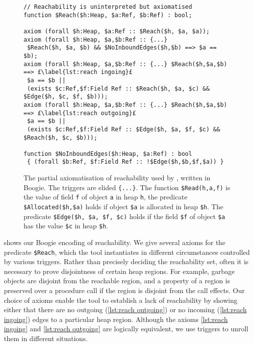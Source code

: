 \documentclass[runningheads,a4paper]{llncs}
\begin{document}
\begin{figure}[htbp]%
\centering%
\noindent\begin{lstlisting}[style=Boogie,firstnumber=auto,name=copyex]
// Reachability is uninterpreted but axiomatised
function $Reach($h:Heap, $a:Ref, $b:Ref) : bool;

axiom (forall $h:Heap, $a:Ref :: $Reach($h, $a, $a));
axiom (forall $h:Heap, $a,$b:Ref :: {...}
 $Reach($h, $a, $b) && $NoInboundEdges($h,$b) ==> $a == $b);
axiom (forall $h:Heap, $a,$b:Ref :: {...} $Reach($h,$a,$b) ==> £\label{lst:reach ingoing}£
 $a == $b ||
 (exists $c:Ref,$f:Field Ref :: $Reach($h, $a, $c) && $Edge($h, $c, $f, $b)));
axiom (forall $h:Heap, $a,$b:Ref :: {...} $Reach($h,$a,$b) ==> £\label{lst:reach outgoing}£
 $a == $b ||
 (exists $c:Ref,$f:Field Ref :: $Edge($h, $a, $f, $c) && $Reach($h, $c, $b)));

function $NoInboundEdges($h:Heap, $a:Ref) : bool
 { (forall $b:Ref, $f:Field Ref :: !$Edge($h,$b,$f,$a)) }
\end{lstlisting}
\caption{The partial axiomatisation of reachability used by \tool{}, written in Boogie. The triggers are elided \texttt{\{...\}}. The function \texttt{\$Read(h,a,f)} is the value of field \texttt{f} of object \texttt{a} in heap \texttt{h}, the predicate \texttt{\$Allocated(\$h,\$a)} holds if object \texttt{\$a} is allocated in heap \texttt{\$h}. The predicate \texttt{\$Edge(\$h, \$a, \$f, \$c)} holds if the field \texttt{\$f} of object \texttt{\$a} has the value \texttt{\$c} in heap \texttt{\$h}.\label{fig:reachability}}
\end{figure}
 shows our Boogie encoding of reachability. We give several axioms for the predicate \texttt{\$Reach}, which the tool instantiates in different circumstances controlled by various triggers. Rather than precisely deciding the reachability set, often it is necessary to prove disjointness of certain heap regions. For example, garbage objects are disjoint from the reachable region, and a property of a region is preserved over a procedure call if the region is disjoint from the call effects. Our choice of axioms enable the tool to establish a lack of reachability by showing either that there are no outgoing (\cref{lst:reach outgoing}) or no incoming (\cref{lst:reach ingoing}) edges to a particular heap region. Although the axioms \cref{lst:reach ingoing} and \cref{lst:reach outgoing} are logically equivalent, we use triggers to unroll them in different situations.
\end{document}
